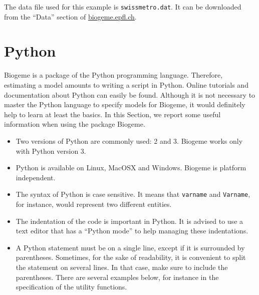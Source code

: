 \documentclass[12pt,a4paper]{article}
\begin{document}
The data file used for this example is \texttt{swissmetro.dat}. It can
be downloaded from the ``Data'' section of \href{http://biogeme.epfl.ch}{biogeme.epfl.ch}.



\section{Python}

Biogeme is a package of the Python programming
language. Therefore, estimating a model amounts to writing a script in
 Python. Online tutorials and  documentation about Python can easily be found. Although it
is not necessary to master the Python language to specify models for
Biogeme, it would definitely help to learn at least the basics. In
this Section, we report some useful information when using the package
Biogeme.
\begin{itemize}
\item Two versions of Python are commonly used: 2 and 3. Biogeme works only
  with Python version 3.
 \item Python is available on Linux, MacOSX and
   Windows. Biogeme is platform independent. 
\item The syntax of Python is case sensitive. It means that
\verb+varname+ and \verb+Varname+, for instance, would represent two
different entities.
\item The indentation of the code is important in Python. It is
  advised to use a text editor that has a ``Python mode'' to help
  managing these indentations.
\item A Python statement must be on a single line, except if it is
  surrounded by parentheses. Sometimes, for the sake of readability,
  it is convenient to split the statement on several lines. In that
  case, make sure to include the parentheses.  There are several
  examples below, for instance in the specification of the utility
  functions.
\end{itemize}
\end{document}
